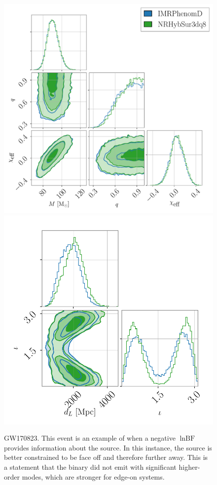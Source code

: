 \documentclass[prd,superscriptaddress,twocolumn,nopreprintnumbers,floatfix,longbibliography]{revtex4}
\begin{document}
\begin{appendix}
\begin{figure}[t!]
    \centering
    \includegraphics[width=0.56\linewidth]{GW170823_marg_intrinsic.pdf}
    \includegraphics[width=0.405\linewidth]{GW170823_marg_extrinsic.pdf}
    \caption{
    GW170823.
    This event is an example of when a negative $\ln\text{BF}$ provides information about the source.
    In this instance, the source is better constrained to be face off and therefore further away.
    This is a statement that the binary did not emit with significant higher-order modes, which are stronger for edge-on systems.
    }
    \label{fig:GW170823}
\end{figure}

\end{appendix}
\end{document}
